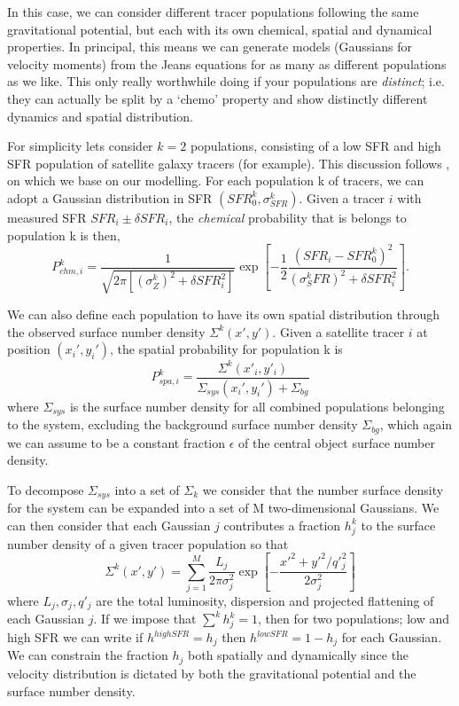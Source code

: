 In this case, we can consider different tracer populations following the same gravitational potential, but each with its own chemical, spatial and dynamical properties. In principal, this means we can generate models (Gaussians for velocity moments) from the Jeans equations for as many as different populations as we like. This only really worthwhile doing if your populations are \textit{distinct}; i.e. they can actually be split by a `chemo' property and show distinctly different dynamics and spatial distribution. 

For simplicity lets consider $k=2$ populations, consisting of a low SFR and high SFR population of satellite galaxy tracers (for example). This discussion follows \citet{zhu16sculptor}, on which we base on our modelling. For each population k of tracers, we can adopt a Gaussian distribution in SFR $(SFR^{k}_{0},\sigma^{k}_{SFR})$. Given a tracer $i$ with measured SFR $SFR_i \pm \delta SFR_i$, the \textit{chemical} probability that is belongs to population k is then,
\begin{equation}
P_{chm,i}^{k} = \frac{1}{\sqrt{2\pi [(\sigma^{k}_{Z})^2+ \delta SFR_{i}^2]}}\exp{\left[-\frac{1}{2}\frac{(SFR_{i}-SFR^k_0)^2}{(\sigma^k_SFR)^2+\delta SFR_i^2}\right]}. 
\end{equation}

We can also define each population to have its own spatial distribution through the observed surface number density $\Sigma^k(x',y')$. Given a satellite tracer $i$ at position $(x_i',y_i')$, the spatial probability for population k is
\begin{equation}
P^{k}_{spa,i} = \frac{\Sigma^k(x'_i,y'_i)}{\Sigma_{sys}(x_i',y_i')+\Sigma_{bg}}
\end{equation}
where $\Sigma_{sys}$ is the surface number density for all combined populations belonging to the system, excluding the background surface number density $\Sigma_{bg}$, which again we can assume to be a constant fraction $\epsilon$ of the central object surface number density. 

To decompose $\Sigma_{sys}$ into a set of $\Sigma_{k}$ we consider that the number surface density for the system can be expanded into a set of M two-dimensional Gaussians. We can then consider that each Gaussian $j$ contributes a fraction $h^{k}_{j}$ to the surface number density of a given tracer population so that
\begin{equation}
\Sigma^{k}(x',y') = \sum^{M}_{j=1} \frac{L_j}{2\pi \sigma^2_j} \exp{\left[-\frac{x'^2 + y'^2 /q'^2_j}{2\sigma^2_j}\right]}
\end{equation}
where $L_j,\sigma_j,q'_j$ are the total luminosity, dispersion and projected flattening of each Gaussian $j$. If we impose that $\sum^k h^k_j = 1$, then for two populations; low and high SFR we can write if $h^{high SFR} = h_j$ then $h^{low SFR} = 1 - h_j$ for each Gaussian. We can constrain the fraction $h_j$ both spatially and dynamically since the velocity distribution is dictated by both the gravitational potential and the surface number density.

